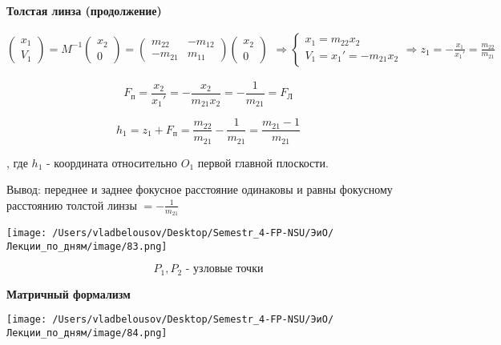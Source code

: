 \documentclass[12pt, a4paper]{report}
\begin{document}
\fi


\textbf{Толстая линза (продолжение)} 

\[ \begin{pmatrix}
x_1 \\
V_1 
\end{pmatrix} = M^{-1 }
\begin{pmatrix}
    x_2 \\
    0 
\end{pmatrix} =
\begin{pmatrix}
m_{22} & -m_{12}\\
-m_{21} & m_{11}
\end{pmatrix}\begin{pmatrix}
    x_2\\
    0 
\end{pmatrix} 
\begin{aligned}
    \Rightarrow 
    \begin{cases}
        x_1= m_{22} x_2 \\
        V_1 = x_1 ' = - m_{21} x_2 
    \end{cases} 
    \Rightarrow
    z_1  =- \frac{x_1}{x_1' }= \frac{m_{22}}{m_{21}}  
\end{aligned}
\] 

\[ F_{\text{п} } = \frac{x_2}{x_1 '} = -\frac{x_2 }{m_{21}x_2 } = - \frac{1}{m_{21} } = F_{\text{Л} }    \] 

\[ h_1 = z_1 + F_{\text{п} } = \frac{m_{22}}{m_{21}} - \frac{1}{m_{21} } = \frac{m_{21} - 1 }{m_{21}}     \] 

, где \( h_1      \) - координата относительно \( O_1 \) первой главной плоскости.

Вывод: переднее и заднее фокусное расстояние одинаковы и равны  фокусному расстоянию толстой линзы \( = \displaystyle  - \frac{1}{m_{21}}  \) 

\begin{center}
    \texttt{[image: /Users/vladbelousov/Desktop/Semestr\_4-FP-NSU/ЭиО/Лекции\_по\_дням/image/83.png]}
\end{center} 
\[ P_1,P_2 \text{ - узловые точки}  \] 

\textbf{Матричный формализм} 

\begin{center}
    \texttt{[image: /Users/vladbelousov/Desktop/Semestr\_4-FP-NSU/ЭиО/Лекции\_по\_дням/image/84.png]}
\end{center}  
\end{document}
